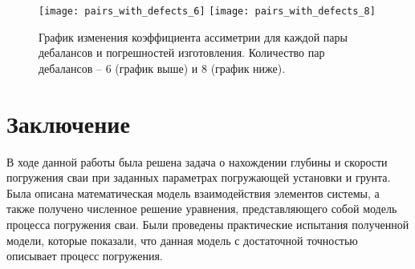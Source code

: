 \begin{figure}[ht]
    \centering
    \texttt{[image: pairs\_with\_defects\_6]}
    \texttt{[image: pairs\_with\_defects\_8]}
    \caption{График изменения коэффициента ассиметрии для каждой пары дебалансов и погрешностей изготовления.
    Количество пар дебалансов -- 6 (график выше) и 8 (график ниже).}
    \label{fig:pairs_with_defects_even}
\end{figure}

\clearpage

\section*{Заключение}

В ходе данной работы была решена задача о нахождении глубины и скорости погружения сваи при заданных параметрах погружающей
установки и грунта. Была описана математическая модель взаимодействия элементов системы, а также получено численное решение
уравнения, представляющего собой модель процесса погружения сваи. Были проведены практические испытания полученной модели,
которые показали, что данная модель с достаточной точностью описывает процесс погружения.

\clearpage


\nocite{*}

\printbibliography{}